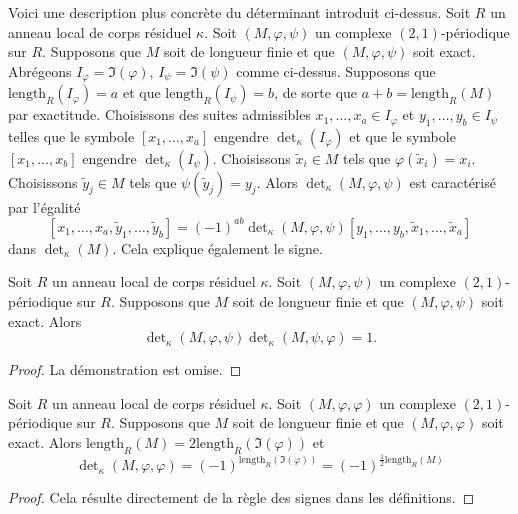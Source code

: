 \begin{remark}
\label{remark-more-elementary}
Voici une description plus concrète du déterminant
introduit ci-dessus. Soit $R$ un anneau local de corps résiduel $\kappa$.
Soit $(M, \varphi, \psi)$ un complexe $(2, 1)$-périodique sur $R$.
Supposons que $M$ soit de longueur finie et que $(M, \varphi, \psi)$ soit
exact. Abrégeons $I_\varphi = \Im(\varphi)$,
$I_\psi = \Im(\psi)$ comme ci-dessus.
Supposons que $\text{length}_R(I_\varphi) = a$ et que
$\text{length}_R(I_\psi) = b$, de sorte que $a + b = \text{length}_R(M)$
par exactitude. Choisissons des suites admissibles
$x_1, \ldots, x_a \in I_\varphi$ et $y_1, \ldots, y_b \in I_\psi$
telles que le symbole $[x_1, \ldots, x_a]$ engendre $\det_\kappa(I_\varphi)$
et que le symbole $[x_1, \ldots, x_b]$ engendre $\det_\kappa(I_\psi)$.
Choisissons $\tilde x_i \in M$ tels que $\varphi(\tilde x_i) = x_i$.
Choisissons $\tilde y_j \in M$ tels que $\psi(\tilde y_j) = y_j$.
Alors $\det_\kappa(M, \varphi, \psi)$ est caractérisé
par l'égalité
$$
[x_1, \ldots, x_a, \tilde y_1, \ldots, \tilde y_b]
=
(-1)^{ab} \det\nolimits_\kappa(M, \varphi, \psi)
[y_1, \ldots, y_b, \tilde x_1, \ldots, \tilde x_a]
$$
dans $\det_\kappa(M)$. Cela explique également le signe.
\end{remark}

\begin{lemma}
\label{lemma-periodic-determinant-shift}
Soit $R$ un anneau local de corps résiduel $\kappa$.
Soit $(M, \varphi, \psi)$ un complexe $(2, 1)$-périodique sur $R$.
Supposons que $M$ soit de longueur finie et que $(M, \varphi, \psi)$ soit
exact. Alors
$$
\det\nolimits_\kappa(M, \varphi, \psi)
\det\nolimits_\kappa(M, \psi, \varphi)
= 1.
$$
\end{lemma}

\begin{proof}
La démonstration est omise.
\end{proof}

\begin{lemma}
\label{lemma-periodic-determinant-sign}
Soit $R$ un anneau local de corps résiduel $\kappa$.
Soit $(M, \varphi, \varphi)$ un complexe $(2, 1)$-périodique sur $R$.
Supposons que $M$ soit de longueur finie et que $(M, \varphi, \varphi)$ soit
exact. Alors $\text{length}_R(M) = 2 \text{length}_R(\Im(\varphi))$
et
$$
\det\nolimits_\kappa(M, \varphi, \varphi)
=
(-1)^{\text{length}_R(\Im(\varphi))}
=
(-1)^{\frac{1}{2}\text{length}_R(M)}
$$
\end{lemma}

\begin{proof}
Cela résulte directement de la règle des signes dans les définitions.
\end{proof}

